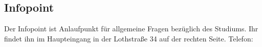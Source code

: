 \subsection{Infopoint}
Der Infopoint ist Anlaufpunkt für allgemeine Fragen bezüglich des 
Studiums. Ihr findet ihn im Haupteingang in der Lothstraße 34 auf der 
rechten Seite. Telefon: 